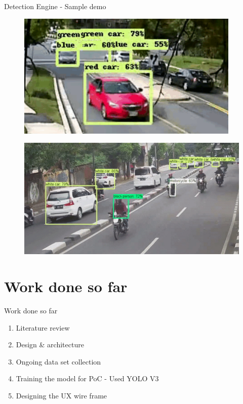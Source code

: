 \documentclass{beamer}
\begin{document}
\begin{frame}[allowframebreaks]{Detection Engine - Sample demo}
	\begin{figure}
		\includegraphics[width=0.95\textwidth]{res/detection_demo.png}
	\end{figure}
	\begin{figure}
		\includegraphics[height=0.8\textheight]{res/detection_demo2.png}
	\end{figure}
\end{frame}



\section{Work done so far}
\begin{frame}{Work done so far}
\begin{enumerate}
    \item Literature review
    \item Design \& architecture
    \item Ongoing data set collection
    \item Training the model for PoC - Used YOLO V3
    \item Designing the UX wire frame    
\end{enumerate}
\end{frame}
\end{document}
